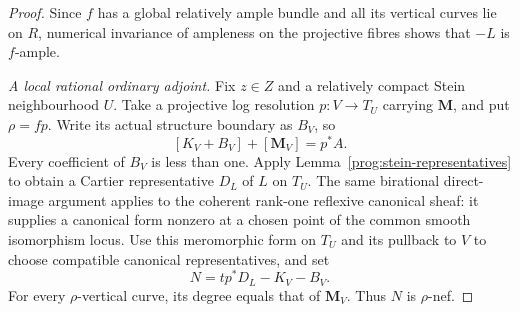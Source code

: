 \begin{proof}
Since $f$ has a global relatively ample bundle and all its vertical
curves lie on $R$, numerical invariance of ampleness on the projective
fibres shows that $-L$ is $f$-ample.

\smallskip\noindent
\emph{A local rational ordinary adjoint.}
Fix $z\in Z$ and a relatively compact Stein neighbourhood $U$.
Take a projective log resolution $p:V\to T_U$ carrying $\mathbf M$,
and put $\rho=f p$. Write its actual structure boundary as $B_V$, so
\[
 [K_V+B_V]+[\mathbf M_V]=p^*A.
\]
Every coefficient of $B_V$ is less than one. Apply
Lemma~\ref{prog:stein-representatives} to obtain a Cartier
representative $D_L$ of $L$ on $T_U$. The same birational direct-image
argument applies to the coherent rank-one reflexive canonical sheaf:
it supplies a canonical form nonzero at a chosen point of the common
smooth isomorphism locus. Use this meromorphic form on $T_U$ and its
pullback to $V$ to choose compatible canonical representatives, and set
\[
 N=t p^*D_L-K_V-B_V.
\]
For every $\rho$-vertical curve, its degree equals that of $\mathbf M_V$.
Thus $N$ is $\rho$-nef.


\end{proof}
